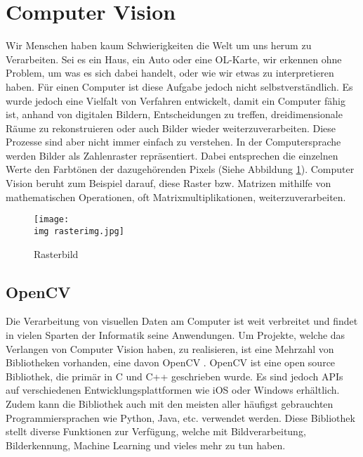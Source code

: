 \section{Computer Vision}

Wir Menschen haben kaum Schwierigkeiten die Welt um uns herum zu Verarbeiten. Sei es ein Haus, ein Auto oder eine OL-Karte, wir erkennen ohne Problem, um was es sich dabei handelt, oder wie wir etwas zu interpretieren haben. Für einen Computer ist diese Aufgabe jedoch nicht selbstverständlich. Es wurde jedoch eine Vielfalt von Verfahren entwickelt, damit ein Computer fähig ist, anhand von digitalen Bildern, Entscheidungen zu treffen, dreidimensionale Räume zu rekonstruieren oder auch Bilder wieder  weiterzuverarbeiten. Diese Prozesse sind aber nicht immer einfach zu verstehen. In der Computersprache werden Bilder als Zahlenraster repräsentiert. Dabei entsprechen die einzelnen Werte den Farbtönen der dazugehörenden Pixels (Siehe Abbildung \ref{fig:rasterimg}). \cite{computervision_szeliski:1, opencv_bradski_kaehler:1} Computer Vision beruht zum Beispiel darauf, diese Raster bzw. Matrizen mithilfe von mathematischen Operationen, oft Matrixmultiplikationen, weiterzuverarbeiten.

\begin{figure}[hbt]
	\centering
	\texttt{[image: \\img rasterimg.jpg]}
	\caption{Rasterbild}
	\label{fig:rasterimg}
\end{figure}


\subsection{OpenCV}

Die Verarbeitung von visuellen Daten am Computer ist weit verbreitet und findet in vielen Sparten der Informatik seine Anwendungen. Um Projekte, welche das Verlangen von Computer Vision haben, zu realisieren, ist eine Mehrzahl von Bibliotheken vorhanden, eine davon OpenCV \cite{opencv:1}. OpenCV ist eine open source Bibliothek, die primär in C und C++ geschrieben wurde. Es sind jedoch APIs auf verschiedenen Entwicklungsplattformen wie iOS oder Windows erhältlich. Zudem kann die Bibliothek auch mit den meisten aller häufigst gebrauchten Programmiersprachen wie Python, Java, etc. verwendet werden. Diese Bibliothek stellt diverse Funktionen zur Verfügung, welche mit Bildverarbeitung, Bilderkennung, Machine Learning und vieles mehr zu tun haben.\cite{opencv_bradski_kaehler:1}




